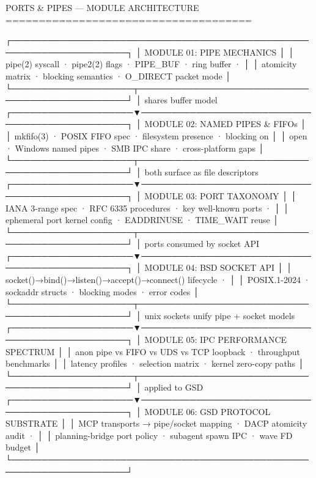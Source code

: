\documentclass[11pt,letterpaper]{article}
\begin{document}
\begin{asciibox}
PORTS & PIPES — MODULE ARCHITECTURE
=====================================

 ┌─────────────────────────────────────────────────────────────────────┐
 │                   MODULE 01: PIPE MECHANICS                         │
 │   pipe(2) syscall · pipe2(2) flags · PIPE_BUF · ring buffer ·      │
 │   atomicity matrix · blocking semantics · O_DIRECT packet mode      │
 └────────────────────┬────────────────────────────────────────────────┘
                      │ shares buffer model
 ┌────────────────────▼────────────────────────────────────────────────┐
 │                  MODULE 02: NAMED PIPES & FIFOs                     │
 │   mkfifo(3) · POSIX FIFO spec · filesystem presence · blocking on   │
 │   open · Windows named pipes · SMB IPC share · cross-platform gaps  │
 └────────────────────┬────────────────────────────────────────────────┘
                      │ both surface as file descriptors
 ┌────────────────────▼────────────────────────────────────────────────┐
 │                   MODULE 03: PORT TAXONOMY                          │
 │   IANA 3-range spec · RFC 6335 procedures · key well-known ports ·  │
 │   ephemeral port kernel config · EADDRINUSE · TIME_WAIT reuse       │
 └────────────────────┬────────────────────────────────────────────────┘
                      │ ports consumed by socket API
 ┌────────────────────▼────────────────────────────────────────────────┐
 │                   MODULE 04: BSD SOCKET API                         │
 │   socket()→bind()→listen()→accept()→connect() lifecycle ·           │
 │   POSIX.1-2024 · sockaddr structs · blocking modes · error codes    │
 └────────────────────┬────────────────────────────────────────────────┘
                      │ unix sockets unify pipe + socket models
 ┌────────────────────▼────────────────────────────────────────────────┐
 │                  MODULE 05: IPC PERFORMANCE SPECTRUM                │
 │   anon pipe vs FIFO vs UDS vs TCP loopback · throughput benchmarks  │
 │   latency profiles · selection matrix · kernel zero-copy paths      │
 └────────────────────┬────────────────────────────────────────────────┘
                      │ applied to GSD
 ┌────────────────────▼────────────────────────────────────────────────┐
 │                  MODULE 06: GSD PROTOCOL SUBSTRATE                  │
 │   MCP transports → pipe/socket mapping · DACP atomicity audit ·     │
 │   planning-bridge port policy · subagent spawn IPC · wave FD budget │
 └─────────────────────────────────────────────────────────────────────┘
\end{asciibox}
\end{document}
